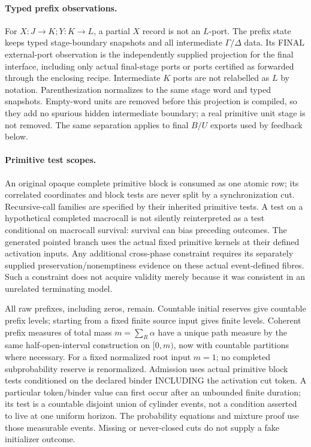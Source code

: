 \documentclass[11pt]{article}
\begin{document}
\paragraph{Typed prefix observations.}
For $X:J\to K;Y:K\to L$, a partial $X$ record is not an $L$-port. The prefix state keeps typed stage-boundary snapshots and all intermediate $\Gamma/\Delta$ data. Its FINAL external-port observation is the independently supplied projection for the final interface, including only actual final-stage ports or ports certified as forwarded through the enclosing recipe. Intermediate $K$ ports are not relabelled as $L$ by notation. Parenthesization normalizes to the same stage word and typed snapshots. Empty-word units are removed before this projection is compiled, so they add no spurious hidden intermediate boundary; a real primitive unit stage is not removed. The same separation applies to final $B/U$ exports used by feedback below.

\paragraph{Primitive test scopes.}
An original opaque complete primitive block is consumed as one atomic row; its correlated coordinates and block tests are never split by a synchronization cut. Recursive-call families are specified by their inherited primitive tests. A test on a hypothetical completed macrocall is not silently reinterpreted as a test conditional on macrocall survival: survival can bias preceding outcomes. The generated pointed branch uses the actual fixed primitive kernels at their defined activation inputs. Any additional cross-phase constraint requires its separately supplied preservation/nonemptiness evidence on these actual event-defined fibres. Such a constraint does not acquire validity merely because it was consistent in an unrelated terminating model.

All raw prefixes, including zeros, remain. Countable initial reserves give countable prefix levels; starting from a fixed finite source input gives finite levels. Coherent prefix measures of total mass $m=\sum_R\alpha$ have a unique path measure by the same half-open-interval construction on $[0,m)$, now with countable partitions where necessary. For a fixed normalized root input $m=1$; no completed subprobability reserve is renormalized. Admission uses actual primitive block tests conditioned on the declared binder INCLUDING the activation cut token. A particular token/binder value can first occur after an unbounded finite duration; its test is a countable disjoint union of cylinder events, not a condition asserted to live at one uniform horizon. The probability equations and mixture proof use those measurable events. Missing or never-closed cuts do not supply a fake initializer outcome.
\end{document}

